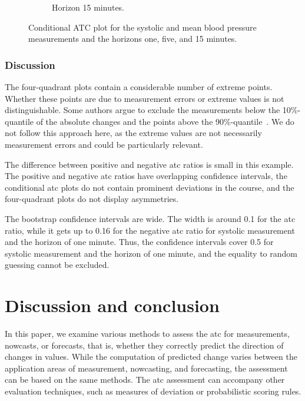 \documentclass[pdflatex]{sn-jnl}
\theoremstyle{plain}%
\theoremstyle{definition}
\begin{document}
\begin{figure}
\begin{subfigure}[t]{.32\textwidth}
        \caption{Horizon 15 minutes.}
    \end{subfigure}\hspace{0.01\textwidth}
    \caption{Conditional ATC plot for the systolic and mean blood pressure measurements and the horizons one, five, and 15 minutes. }
    \label{fig:app-mimic-cond-prob}
\end{figure}




\subsubsection*{Discussion}

The four-quadrant plots contain a considerable number of extreme points.
Whether these points are due to measurement errors or extreme values is not distinguishable.
Some authors argue to exclude the measurements below the 10\%-quantile of the absolute changes and the points above the 90\%-quantile~\citep[see][]{Critchley2010}.
We do not follow this approach here, as the extreme values are not necessarily measurement errors and could be particularly relevant.

The difference between positive and negative \ac{atc} ratios is small in this example.
The positive and negative \ac{atc} ratios have overlapping confidence intervals, the conditional \ac{atc} plots do not contain prominent deviations in the course, and the four-quadrant plots do not display asymmetries.

The bootstrap confidence intervals are wide.
The width is around 0.1 for the \ac{atc} ratio, while it gets up to 0.16 for the negative \ac{atc} ratio for systolic measurement and the horizon of one minute.
Thus, the confidence intervals cover 0.5 for systolic measurement and the horizon of one minute, and the equality to random guessing cannot be excluded.



\section{Discussion and conclusion}\label{sec:atc-conclusion}

In this paper, we examine various methods to assess the \acf{atc} for measurements, nowcasts, or forecasts, that is, whether they correctly predict the direction of changes in values.
While the computation of predicted change varies between the application areas of measurement, nowcasting, and forecasting, the assessment can be based on the same methods.
The \ac{atc} assessment can accompany other evaluation techniques, such as measures of deviation or probabilistic scoring rules.
\end{document}
